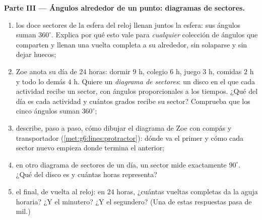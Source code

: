 \begin{problem}
\medskip
\noindent\textbf{Parte III --- Ángulos alrededor de un punto: diagramas
de sectores.}
\begin{enumerate}[resume]
  \item los doce sectores de la esfera del reloj llenan juntos la
        esfera: sus ángulos suman $360^\circ$. Explica por qué
        esto vale para \emph{cualquier} colección de ángulos que
        comparten  y llenan una vuelta completa a su alrededor, sin
        solaparse y sin dejar huecos;
  \item Zoe anota su día de $24$ horas: dormir $9$ h, colegio
        $6$ h, juego $3$ h, comidas $2$ h y todo lo demás $4$ h.
        Quiere un \emph{diagrama de sectores}: un disco en el que cada actividad
        recibe un sector, con ángulos proporcionales a los tiempos.
        ¿Qué  del día es cada actividad y cuántos
        grados recibe su sector? Comprueba que los cinco ángulos suman
        $360^\circ$;
  \item describe, paso a paso, cómo dibujar el diagrama de Zoe con
        compás y transportador
        (\cref{met:g6:lines:protractor}): dónde va el primer 
        y cómo cada sector nuevo empieza donde termina el
        anterior;
  \item en otro diagrama de sectores de un día, un sector mide
        exactamente $90^\circ$. ¿Qué  del disco es
        y cuántas horas representa?
  \item el final, de vuelta al reloj: en $24$ horas, ¿cuántas
        vueltas completas da la aguja horaria? ¿Y el minutero? ¿Y el
        segundero? (Una de estas respuestas pasa de mil.)
\end{enumerate}
\end{problem}
